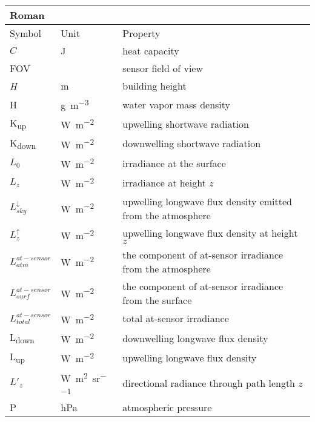 \begin{table}[H]
	\centering
	\begin{tabular}{p{1.5cm}p{3cm}p{10cm}}
		Roman &&\\
		\toprule
		Symbol & Unit & Property \\
		\midrule
		$C$ & \si{\joule} & heat capacity \\
		FOV & \si{\deg} & sensor field of view \\
		\textit{H} & \si{\meter} & building height \\
		H & \si{\gram\per\meter\cubed} & water vapor mass density \\
		K\textsubscript{up} & \si{\watt\per\square\meter} & upwelling shortwave radiation \\
		K\textsubscript{down} & \si{\watt\per\square\meter} & downwelling shortwave radiation \\
		$L_0$ & \si{\watt\per\square\meter} & irradiance at the surface\\
		$L_z$ & \si{\watt\per\square\meter} & irradiance at height $z$\\
		$L^{\downarrow}_{sky}$ & \si{\watt\per\square\meter} & upwelling longwave flux density emitted from the atmosphere\\
		$L^{\uparrow}_z$ & \si{\watt\per\square\meter} & upwelling longwave flux density at height $z$\\
		$L_{atm}^{at-sensor}$ & \si{\watt\per\square\meter} & the component of at-sensor irradiance from the atmosphere\\
		$L_{surf}^{at-sensor}$ & \si{\watt\per\square\meter} & the component of at-sensor irradiance from the surface\\
		$L_{total}^{at-sensor}$ & \si{\watt\per\square\meter} & total at-sensor irradiance\\
		L\textsubscript{down} & \si{\watt\per\square\meter} & downwelling longwave flux density \\
		L\textsubscript{up} & \si{\watt\per\square\meter} & upwelling longwave flux density \\
		$L'_z$ & \si{\watt\per\square\meter\per\steradian} & directional radiance through path length $z$\\
		P & \si{\hecto\pascal} & atmospheric pressure \\
		\bottomrule
	\end{tabular} 
\end{table}


